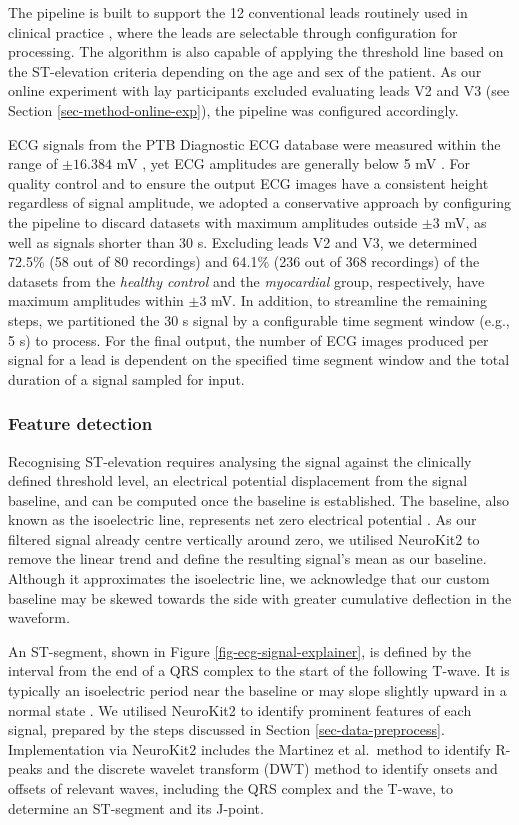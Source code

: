 \documentclass[
  10pt,
  letterpaper,
]{article}
\begin{document}
The pipeline is built to support the 12 conventional leads routinely
used in clinical practice \cite{ashley2004}, where the leads are
selectable through configuration for processing. The algorithm is also
capable of applying the threshold line based on the ST-elevation
criteria depending on the age and sex of the patient. As our online
experiment with lay participants excluded evaluating leads V2 and V3
(see Section \ref{sec-method-online-exp}), the pipeline was configured
accordingly.

ECG signals from the PTB Diagnostic ECG database were measured within
the range of \(\pm 16.384\) mV \cite{ptb}, yet ECG amplitudes are
generally below 5 mV \cite{Xie2020}. For quality control and to ensure
the output ECG images have a consistent height regardless of signal
amplitude, we adopted a conservative approach by configuring the
pipeline to discard datasets with maximum amplitudes outside \(\pm 3\)
mV, as well as signals shorter than 30 s. Excluding leads V2 and V3, we
determined 72.5\% (58 out of 80 recordings) and 64.1\% (236 out of 368
recordings) of the datasets from the \textit{healthy control} and the
\textit{myocardial} group, respectively, have maximum amplitudes within
\(\pm3\) mV. In addition, to streamline the remaining steps, we
partitioned the 30 s signal by a configurable time segment window (e.g.,
5 s) to process. For the final output, the number of ECG images produced
per signal for a lead is dependent on the specified time segment window
and the total duration of a signal sampled for input.

\subsubsection{Feature detection}\label{feature-detection}

Recognising ST-elevation requires analysing the signal against the
clinically defined threshold level, an electrical potential displacement
from the signal baseline, and can be computed once the baseline is
established. The baseline, also known as the isoelectric line,
represents net zero electrical potential \cite{Strauss2021}. As our
filtered signal already centre vertically around zero, we utilised
NeuroKit2 to remove the linear trend and define the resulting signal's
mean as our baseline. Although it approximates the isoelectric line, we
acknowledge that our custom baseline may be skewed towards the side with
greater cumulative deflection in the waveform.

An ST-segment, shown in Figure \ref{fig-ecg-signal-explainer}, is
defined by the interval from the end of a QRS complex to the start of
the following T-wave. It is typically an isoelectric period near the
baseline or may slope slightly upward in a normal state
\citep{ashley2004, Strauss2021}. We utilised NeuroKit2 to identify
prominent features of each signal, prepared by the steps discussed in
Section \ref{sec-data-preprocess}. Implementation via NeuroKit2 includes
the Martinez et al.~method \cite{martinez2004} to identify R-peaks and
the discrete wavelet transform (DWT) method to identify onsets and
offsets of relevant waves, including the QRS complex and the T-wave, to
determine an ST-segment and its J-point.
\end{document}
